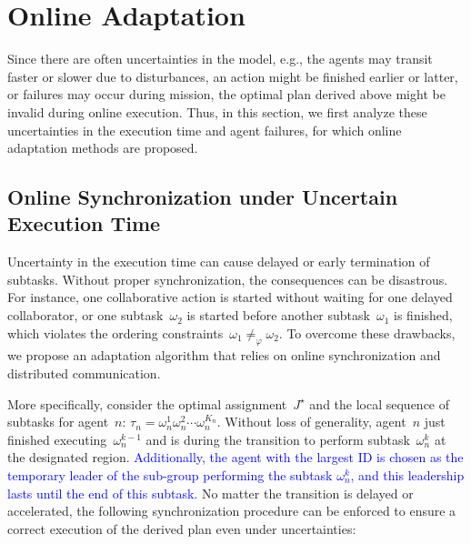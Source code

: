\section{Online Adaptation}
\label{subsec:online-adaptation}

Since there are often uncertainties in the model, e.g., the agents may
transit faster or slower due to disturbances,
an action might be finished earlier or latter,
or failures may occur during mission,
the optimal plan derived above might be invalid during online execution.
Thus, in this section, we first analyze these uncertainties in the execution time
and agent failures, for which online adaptation methods are proposed.

\subsection{Online Synchronization under Uncertain Execution Time}\label{subsubsec:uncertain}
Uncertainty in the execution time can cause delayed or early termination of subtasks.
Without proper synchronization, the consequences can be disastrous.
For instance, one collaborative action is started without waiting for one
delayed collaborator, or one subtask~$\omega_2$ is started before another
subtask~$\omega_1$ is finished, which violates the ordering constraints~$\omega_1\neq_{\varphi} \omega_2$.
To overcome these drawbacks, we propose an adaptation algorithm
that relies on {online synchronization} and distributed communication.

More specifically, consider the optimal assignment~$J^\star$ and the local
sequence of subtasks for agent~$n$: $\tau_n=\omega^1_n\omega^2_n\cdots \omega^{K_n}_n$.
Without loss of generality, agent~$n$ just finished executing~$\omega^{k-1}_n$ and
is during the transition to perform subtask~$\omega^k_n$ at the designated region.
\textcolor{blue}{Additionally, the agent with the largest ID is chosen as the
  temporary leader of the sub-group performing the subtask $\omega^k_n$,
  and this leadership lasts until the end of this subtask.}
No matter the transition is delayed or accelerated,
the following synchronization procedure can be enforced to
ensure a correct execution of the derived plan even under uncertainties:

